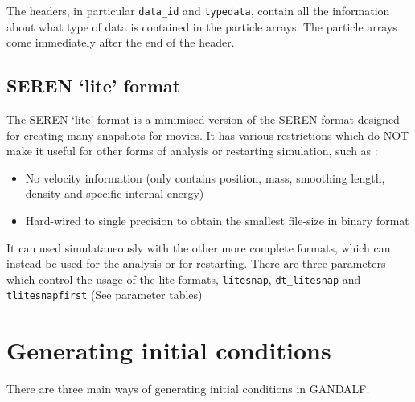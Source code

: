 \documentclass[a4paper]{article}
\newcommand{\var}[1]{\texttt{#1}}
\begin{document}
The headers, in particular \var{data\_id} and \var{typedata}, contain all the information about what type of data is contained in the particle arrays. The particle arrays come immediately after the end of the header.



\subsection{SEREN `lite' format}
The SEREN `lite' format is a minimised version of the SEREN format designed for creating many snapshots for movies.  It has various restrictions which do NOT make it useful for other forms of analysis or restarting simulation, such as : 
\begin{itemize}
\item No velocity information (only contains position, mass, smoothing length, density and specific internal energy)
\item Hard-wired to single precision to obtain the smallest file-size in binary format
\end{itemize}
It can used simulataneously with the other more complete formats, which can instead be used for the analysis or for restarting.  There are three parameters which control the usage of the lite formats, \var{litesnap}, \var{dt\_litesnap} and \var{tlitesnapfirst} (See parameter tables)


\newpage



\section{Generating initial conditions}

There are three main ways of generating initial conditions in GANDALF.

\end{document}
